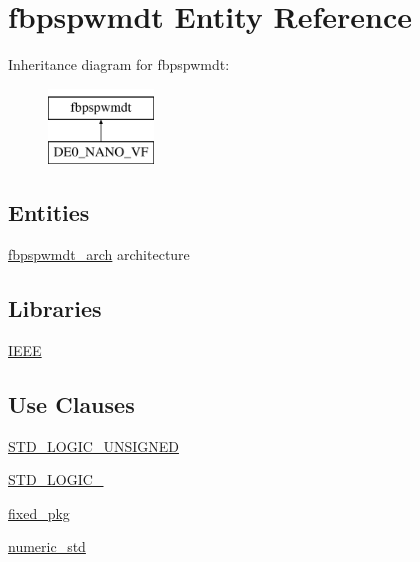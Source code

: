 \hypertarget{classfbpspwmdt}{}\section{fbpspwmdt Entity Reference}
\label{classfbpspwmdt}
Inheritance diagram for fbpspwmdt\+:\begin{figure}[H]
\begin{center}
\leavevmode
\includegraphics[height=2.000000cm]{classfbpspwmdt}
\end{center}
\end{figure}
\subsection*{Entities}
\begin{DoxyCompactItemize}
\item 
\hyperlink{classfbpspwmdt_1_1fbpspwmdt__arch}{fbpspwmdt\+\_\+arch} architecture
\end{DoxyCompactItemize}
\subsection*{Libraries}
 \begin{DoxyCompactItemize}
\item 
\hyperlink{classfbpspwmdt_ae4f03c286607f3181e16b9aa12d0c6d4}{I\+E\+E\+E} 
\end{DoxyCompactItemize}
\subsection*{Use Clauses}
 \begin{DoxyCompactItemize}
\item 
\hyperlink{classfbpspwmdt_a241c3e72dd8024cc8ae831b1b2aed7db}{S\+T\+D\+\_\+\+L\+O\+G\+I\+C\+\_\+\+U\+N\+S\+I\+G\+N\+E\+D}   
\item 
\hyperlink{classfbpspwmdt_aa4b2b25246a821511120e3149b003563}{S\+T\+D\+\_\+\+L\+O\+G\+I\+C\+\_}   
\item 
\hyperlink{classfbpspwmdt_aad86249c80e8c1e7ee1c4748aba748e3}{fixed\+\_\+pkg}   
\item 
\hyperlink{classfbpspwmdt_a2edc34402b573437d5f25fa90ba4013e}{numeric\+\_\+std}   
\end{DoxyCompactItemize}
